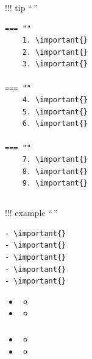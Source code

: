 !!! tip ``\,''

\begin{verbatim}
=== ""
    1. \important{}
    2. \important{}
    3. \important{}
    
=== ""
    4. \important{}
    5. \important{}
    6. \important{}
    
=== ""
    7. \important{}
    8. \important{}
    9. \important{}
\end{verbatim}

\hypertarget{section-7}{%
\subsection{}\label{section-7}}

!!! example ``\,''

\begin{verbatim}
- \important{}
- \important{}
- \important{}  
- \important{}
- \important{}
\end{verbatim}

\begin{itemize}
\item
  \begin{itemize}
  \tightlist
  \item
  \end{itemize}
\item
  \begin{itemize}
  \tightlist
  \item
  \end{itemize}
\end{itemize}

\hypertarget{section-8}{%
\subsubsection{}\label{section-8}}

\begin{itemize}
\item
  \begin{itemize}
  \tightlist
  \item
  \end{itemize}
\item
  \begin{itemize}
  \tightlist
  \item
  \end{itemize}
\end{itemize}

\hypertarget{section-9}{%
\subsection{}\label{section-9}}

